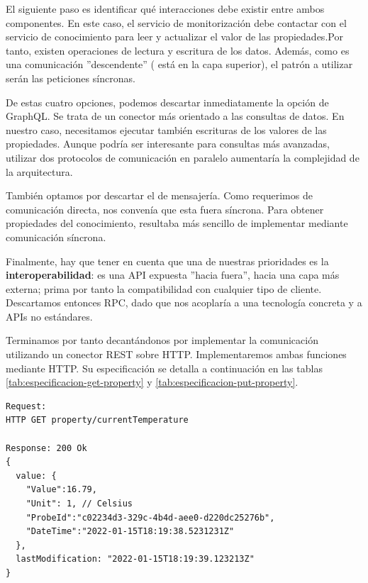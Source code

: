 El siguiente paso es identificar qué interacciones debe existir entre ambos componentes. En este caso, el servicio de monitorización debe contactar con el servicio de conocimiento para leer y actualizar el valor de las propiedades.Por tanto, existen operaciones de lectura y escritura de los datos. Además, como es una comunicación ''descendente'' ( está en la capa superior), el patrón a utilizar serán las peticiones síncronas.

De estas cuatro opciones, podemos descartar inmediatamente la opción de GraphQL. Se trata de un conector más orientado a las consultas de datos. En nuestro caso, necesitamos ejecutar también escrituras de los valores de las propiedades. Aunque podría ser interesante para consultas más avanzadas, utilizar dos protocolos de comunicación en paralelo aumentaría la complejidad de la arquitectura.

También optamos por descartar el  de mensajería. Como requerimos de comunicación directa, nos convenía que esta fuera síncrona. Para obtener propiedades del conocimiento, resultaba más sencillo de implementar mediante comunicación síncrona.

Finalmente, hay que tener en cuenta que una de nuestras prioridades es la \textbf{interoperabilidad}: es una API expuesta ''hacia fuera'', hacia una capa más externa; prima por tanto la compatibilidad con cualquier tipo de cliente. Descartamos entonces RPC, dado que nos acoplaría a una tecnología concreta y a APIs no estándares.

Terminamos por tanto decantándonos por implementar la comunicación utilizando un conector REST sobre HTTP. Implementaremos ambas funciones mediante  HTTP. Su especificación se detalla a continuación en las tablas \ref{tab:especificacion-get-property} y \ref{tab:especificacion-put-property}.

\newsavebox\getpropertyrequestbox
\begin{lrbox}{\getpropertyrequestbox}
  \begin{minipage}[t]{1in}
    \begin{verbatim}
Request:
HTTP GET property/currentTemperature

Response: 200 Ok
{
  value: {
    "Value":16.79,
    "Unit": 1, // Celsius
    "ProbeId":"c02234d3-329c-4b4d-aee0-d220dc25276b",
    "DateTime":"2022-01-15T18:19:38.5231231Z"
  },
  lastModification: "2022-01-15T18:19:39.123213Z"
}
    \end{verbatim}
  \end{minipage}
\end{lrbox}

